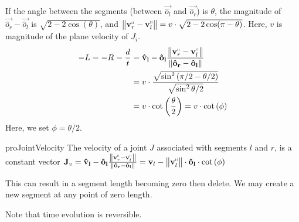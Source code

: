 If the angle between the segments (between $\vec{\hat o_l}$ and $\vec{\hat o_r}$) is $\theta$,
the magnitude of $\vec{\hat o_r}-\vec{\hat o_l}$ is $\sqrt{2-2\cos(\theta)}$,
and $ \left\| \vec v_r^\shortparallel-\vec v_l^\shortparallel\right\| = v\cdot\sqrt{2-2\cos(\pi-\theta)}$.
Here, $v$ is magnitude of the plane velocity of $J_i$.
\begin{align}
-L = -R = \frac dt &= \vec{\hat v_l} - \vec{\hat o_l}\frac{ \left\| \vec v_r^\shortparallel
- \vec v_l^\shortparallel\right\|}{ \left\| \vec{\hat o_r}-\vec{\hat o_l}\right\|}\\
&= v\cdot\frac{\sqrt{\sin^2\left( {\pi/2-\theta/2}\right)}}{\sqrt{\sin^2{\theta/2}}}\\
&= v\cdot\cot\left( \frac{\theta}{2} \right) = v\cdot\cot\left( \phi \right)
\end{align}
Here, we set $\phi = \theta/2$.

\begin{restatable}{pro}{JointVelocity}
\label{pro:joint_velocity}
The velocity of a joint $J$ associated with segments $l$ and $r$, is a constant vector
$\vec J_v = \vec{\hat v_l} - \vec{\hat o_l}\frac{ \left\| \vec v_r^\shortparallel
- \vec v_l^\shortparallel\right\|}{ \left\| \vec{\hat o_r}-\vec{\hat o_l}\right\|}
= \vec v_l - \left\| \vec v_l^\shortparallel\right\|\cdot\vec{\hat o_l}\cdot\cot\left( \phi \right)$
\end{restatable}

This can result in a segment length becoming zero then delete.
We may create a new segment at any point of zero length.

Note that time evolution is reversible.
